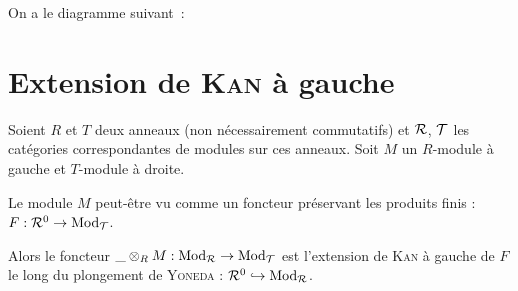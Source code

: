 \documentclass[a4paper]{article}
\begin{document}
On a le diagramme suivant~:
\begin{center}\end{center}


\appendix
\section{Extension de \textsc{Kan} à gauche}
Soient $R$ et $T$ deux anneaux (non nécessairement commutatifs) et $\mathcal{R}$, $\mathcal{T}$ les catégories correspondantes de modules sur ces anneaux. Soit $M$ un $R$-module à gauche et $T$-module à droite.

Le module $M$ peut-être vu comme un foncteur préservant les produits finis : $F : \mathcal{R}^0 \rightarrow \text{Mod}_{\mathcal{T}}$.

Alors le foncteur $\_ \otimes_R M : \text{Mod}_{\mathcal{R}} \rightarrow \text{Mod}_{\mathcal{T}}$ est l'extension de \textsc{Kan} à gauche de $F$ le long du plongement de \textsc{Yoneda} : $\mathcal{R}^0 \hookrightarrow \text{Mod}_{\mathcal{R}}$.

\nocite{*}


\end{document}
